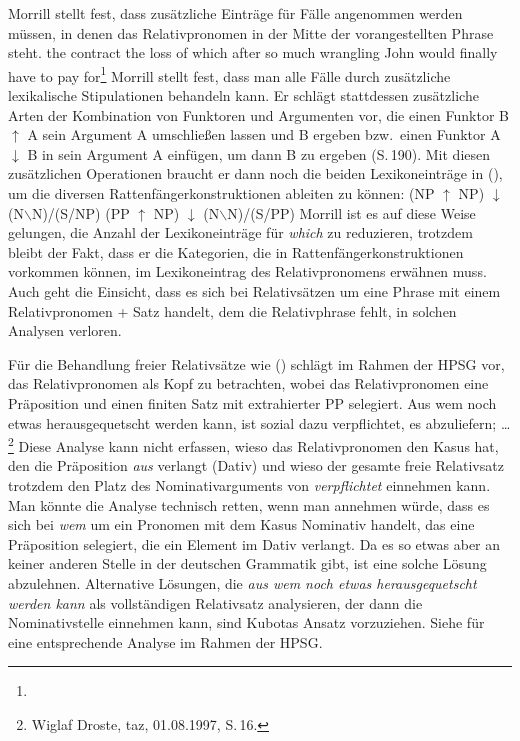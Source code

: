 Morrill stellt fest, dass zusätzliche Einträge für Fälle angenommen werden müssen, in
denen das Relativpronomen in der Mitte der vorangestellten Phrase steht.
\ea
the contract the loss of which after so much wrangling John would finally have to pay for\footnote{
}
\z
Morrill stellt fest, dass man alle Fälle durch zusätzliche lexikalische Stipulationen behandeln
kann. Er schlägt stattdessen zusätzliche Arten der Kombination von Funktoren und Argumenten vor,
die einen Funktor B $\uparrow$ A sein Argument A umschließen lassen und B ergeben bzw.\ einen Funktor A $\downarrow$
B in sein Argument A einfügen, um dann B zu ergeben (S.\,190). Mit diesen zusätzlichen Operationen
braucht er dann noch die beiden Lexikoneinträge in (), um die diversen
Rattenfängerkonstruktionen ableiten zu können:
\eal
\ex (NP $\uparrow$ NP) $\downarrow$ (N$\backslash$N)/(S/NP)
\ex (PP $\uparrow$ NP) $\downarrow$ (N$\backslash$N)/(S/PP)
\zl
Morrill ist es auf diese Weise gelungen, die Anzahl der Lexikoneinträge für \emph{which} zu
reduzieren, trotzdem bleibt der Fakt, dass er die Kategorien, die in Rattenfängerkonstruktionen
vorkommen können, im Lexikoneintrag des Relativpronomens erwähnen muss. 
Auch geht die Einsicht, dass es sich bei Relativsätzen um eine Phrase mit einem Relativpronomen
+ Satz handelt, dem die Relativphrase fehlt, in solchen Analysen verloren.

Für die Behandlung freier Relativsätze wie () schlägt \citet[, 164]{Kubota2003a-u} im
Rahmen der HPSG vor, das Relativpronomen als Kopf zu betrachten, wobei das Relativpronomen eine Präposition und einen finiten
Satz mit extrahierter PP selegiert.
\ea
Aus wem noch etwas herausgequetscht werden kann, ist sozial dazu verpflichtet, es abzuliefern; \ldots\footnote{
        Wiglaf Droste, taz, 01.08.1997, S.\,16.
      }
\z
Diese Analyse kann nicht erfassen, wieso das Relativpronomen den Kasus hat, den die Präposition
\emph{aus} verlangt (Dativ) und wieso der gesamte freie Relativsatz trotzdem den Platz des
Nominativarguments von \emph{verpflichtet} einnehmen kann. Man könnte die Analyse technisch retten,
wenn man annehmen würde, dass es sich bei \emph{wem} um ein Pronomen mit dem Kasus Nominativ handelt,
das eine Präposition selegiert, die ein Element im Dativ verlangt. Da es so etwas aber an keiner
anderen Stelle in der deutschen Grammatik gibt, ist eine solche Lösung abzulehnen. Alternative
Lösungen, die \emph{aus wem noch etwas herausgequetscht werden kann} als vollständigen Relativsatz
analysieren, der dann die Nominativstelle einnehmen kann, sind Kubotas Ansatz vorzuziehen. Siehe
 für eine entsprechende Analyse im Rahmen der HPSG.%

